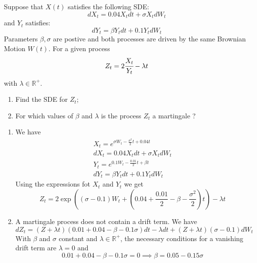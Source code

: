\documentclass[12pt,a4paper]{exam}
\begin{document}
\begin{questions}
\question Suppose that $X(t)$ satisfies the following SDE:
\begin{equation*}
dX_t = 0.04X_t dt + \sigma X_t dW_t
\end{equation*}
and $Y_t$ satisfies:
\begin{equation*}
dY_t = \beta Y_t dt + 0.1 Y_t dW_t
\end{equation*}
Parameters $\beta, \sigma$ are postive and both processes are driven by the same Brownian Motion $W(t)$.
For a given process
\begin{equation*}
Z_t = 2\cfrac{X_t}{Y_t}-\lambda t
\end{equation*}
with $\lambda\in\mathbb{R}^+$.
\begin{enumerate}[label=(\alph*),font=\itshape]
\item Find the SDE for $Z_t$;
\item For which values of $\beta$ and $\lambda$ is the process $Z_t$ a martingale ?
\end{enumerate}

\fillwithlines{3cm}
\begin{solution}
\begin{enumerate}[label=(\alph*),font=\itshape]
\item We have 
\begin{equation*}
\begin{gathered}
X_t = e^{\sigma W_t-\frac{\sigma^2}{2}t+0.04 t}\\
dX_t = 0.04 X_t dt + \sigma X_t dW_t\\
Y_t = e^{0.1W_t -\frac{0.01}{2}t+\beta t}\\
dY_t = \beta Y_t dt + 0.1 Y_t dW_t
\end{gathered}
\end{equation*}
Using the expressions fot $X_t$ and $Y_t$ we get
\begin{equation*}
Z_t = 2\exp\left((\sigma-0.1)W_t + (0.04+\frac{0.01}{2}-\beta-\frac{\sigma^2}{2})t\right)-\lambda t
\end{equation*}
\item A martingale process does not contain a drift term. We have 
\begin{equation*}
dZ_t = (Z+\lambda t)(0.01+0.04-\beta-0.1\sigma)dt-\lambda dt + (Z+\lambda t)(\sigma-0.1)dW_t
\end{equation*}
With $\beta$ and $\sigma$ constant and $\lambda\in\mathbb{R}^+$, the necessary conditions for a vanishing drift term are $\lambda=0$ and
\begin{equation*}
0.01+0.04-\beta-0.1\sigma=0\implies \beta=0.05-0.15\sigma
\end{equation*}
\end{enumerate}
\end{solution}


\end{questions}
\end{document}
